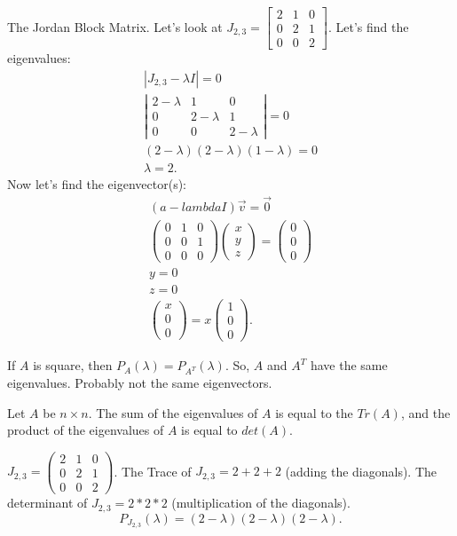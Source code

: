 \begin{eg}
  The Jordan Block Matrix. Let's look at $J_{2,3}=\begin{bmatrix} 2&1&0\\0&2&1\\0&0&2 \end{bmatrix} $. Let's find the eigenvalues:
  \begin{align*}
    | J_{2,3}-\lambda I| = 0\\
    \left| \begin{matrix} 2-\lambda&1&0\\0&2-\lambda&1\\0&0&2-\lambda \end{matrix} \right| =0\\
    (2-\lambda)(2-\lambda)(1-\lambda)=0\\
    \lambda=2
  .\end{align*}
  Now let's find the eigenvector(s):
  \begin{align*}
    (a-lambda I)\vec{v}=\vec{0}\\
    \begin{pmatrix} 0&1&0\\0&0&1\\0&0&0 \end{pmatrix} \begin{pmatrix} x\\y\\z \end{pmatrix} =\begin{pmatrix} 0\\0\\0 \end{pmatrix} \\
    y=0\\
    z=0\\
    \begin{pmatrix} x\\0\\0 \end{pmatrix} =x\begin{pmatrix} 1\\0\\0 \end{pmatrix} 
  .\end{align*}
\end{eg}
\begin{theorem}
  If $A$ is square, then $P_A(\lambda)=P_{A^{T}}(\lambda)$. So, $A$ and $A^{T}$ have the same eigenvalues. Probably not the same eigenvectors.
\end{theorem}
\begin{theorem}
  Let $A$ be $n\times n$. The sum of the eigenvalues of $A$ is equal to the $Tr(A)$, and the product of the eigenvalues of $A$ is equal to $det(A)$.
\end{theorem}
\begin{eg}
  $J_{2,3}=\begin{pmatrix} 2&1&0\\0&2&1\\0&0&2 \end{pmatrix} $. The Trace of $J_{2,3}=2+2+2$ (adding the diagonals). The determinant of $J_{2,3}=2*2*2$ (multiplication of the diagonals).
  \[
    P_{J_{2,3}}(\lambda)=(2-\lambda)(2-\lambda)(2-\lambda)
  .\] 
\end{eg}
